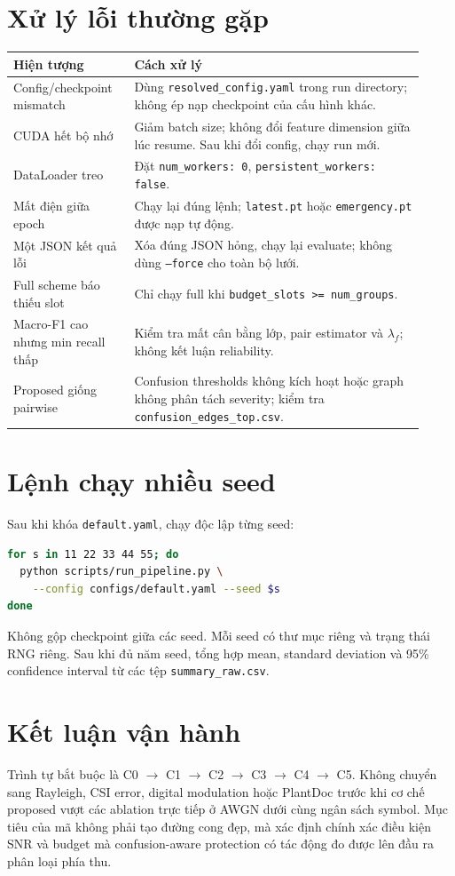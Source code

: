 \documentclass[11pt,journal,onecolumn]{IEEEtran}
\begin{document}
\section{Xử lý lỗi thường gặp}
\begin{longtable}{p{0.27\linewidth}p{0.65\linewidth}}
\toprule
Hiện tượng & Cách xử lý \\
\midrule
\endhead
Config/checkpoint mismatch & Dùng \texttt{resolved\_config.yaml} trong run directory; không ép nạp checkpoint của cấu hình khác. \\
CUDA hết bộ nhớ & Giảm batch size; không đổi feature dimension giữa lúc resume. Sau khi đổi config, chạy run mới. \\
DataLoader treo & Đặt \texttt{num\_workers: 0}, \texttt{persistent\_workers: false}. \\
Mất điện giữa epoch & Chạy lại đúng lệnh; \texttt{latest.pt} hoặc \texttt{emergency.pt} được nạp tự động. \\
Một JSON kết quả lỗi & Xóa đúng JSON hỏng, chạy lại evaluate; không dùng \texttt{--force} cho toàn bộ lưới. \\
Full scheme báo thiếu slot & Chỉ chạy full khi \texttt{budget\_slots >= num\_groups}. \\
Macro-F1 cao nhưng min recall thấp & Kiểm tra mất cân bằng lớp, pair estimator và $\lambda_f$; không kết luận reliability. \\
Proposed giống pairwise & Confusion thresholds không kích hoạt hoặc graph không phân tách severity; kiểm tra \texttt{confusion\_edges\_top.csv}. \\
\bottomrule
\end{longtable}

\section{Lệnh chạy nhiều seed}
Sau khi khóa \texttt{default.yaml}, chạy độc lập từng seed:
\begin{lstlisting}[language=bash]
for s in 11 22 33 44 55; do
  python scripts/run_pipeline.py \
    --config configs/default.yaml --seed $s
done
\end{lstlisting}

Không gộp checkpoint giữa các seed. Mỗi seed có thư mục riêng và trạng thái RNG riêng. Sau khi đủ năm seed, tổng hợp mean, standard deviation và 95\% confidence interval từ các tệp \texttt{summary\_raw.csv}.

\section{Kết luận vận hành}
Trình tự bắt buộc là C0 $\rightarrow$ C1 $\rightarrow$ C2 $\rightarrow$ C3 $\rightarrow$ C4 $\rightarrow$ C5. Không chuyển sang Rayleigh, CSI error, digital modulation hoặc PlantDoc trước khi cơ chế proposed vượt các ablation trực tiếp ở AWGN dưới cùng ngân sách symbol. Mục tiêu của mã không phải tạo đường cong đẹp, mà xác định chính xác điều kiện SNR và budget mà confusion-aware protection có tác động đo được lên đầu ra phân loại phía thu.
\end{document}
